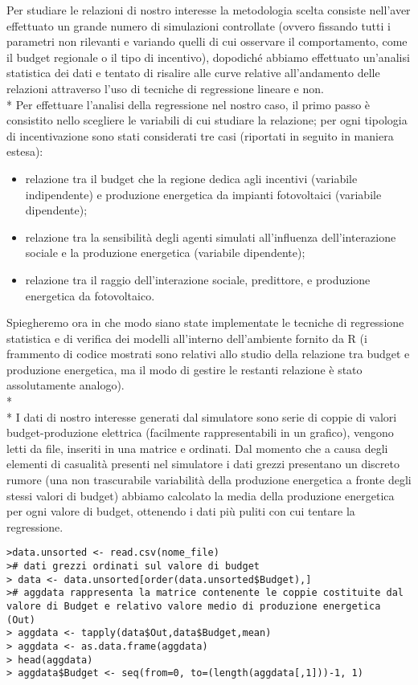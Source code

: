 \documentclass[12pt,a4paper,openright,twoside]{report}
\begin{document}
Per studiare le relazioni di nostro interesse la metodologia scelta consiste nell'aver effettuato un grande numero di simulazioni controllate (ovvero fissando tutti i parametri non rilevanti e variando quelli di cui osservare il comportamento, come il budget regionale o il tipo di incentivo), dopodiché abbiamo effettuato un'analisi statistica dei dati e tentato di risalire alle curve relative all'andamento delle relazioni attraverso l'uso di tecniche di regressione lineare e non.\\*
Per effettuare l'analisi della regressione nel nostro caso, il primo passo è consistito nello scegliere le variabili di cui studiare la relazione; per ogni tipologia di incentivazione sono stati considerati tre casi (riportati in seguito in maniera estesa):
\begin{itemize}
\item relazione tra il budget che la regione dedica agli incentivi (variabile indipendente) e produzione energetica da impianti fotovoltaici (variabile dipendente);
\item relazione tra la sensibilità degli agenti simulati all'influenza dell'interazione sociale e la produzione energetica (variabile dipendente);
\item relazione tra il raggio dell'interazione sociale, predittore, e produzione energetica da fotovoltaico.
\end{itemize}

Spiegheremo ora in che modo siano state implementate le tecniche di regressione statistica e di verifica dei modelli all'interno dell'ambiente fornito da R (i frammento di codice mostrati sono relativi allo studio della relazione tra budget e produzione energetica, ma il modo di gestire le restanti relazione è stato assolutamente analogo).\\*\\*
I dati di nostro interesse generati dal simulatore sono serie di coppie di valori budget-produzione elettrica (facilmente rappresentabili in un grafico), vengono letti da file, inseriti in una matrice e ordinati. Dal momento che a causa degli elementi di casualità presenti nel simulatore i dati grezzi presentano un discreto rumore (una non trascurabile variabilità della produzione energetica a fronte degli stessi valori di budget) abbiamo calcolato la media della produzione energetica per ogni valore di budget, ottenendo i dati più puliti con cui tentare la regressione.

\begin{lstlisting}
>data.unsorted <- read.csv(nome_file)
># dati grezzi ordinati sul valore di budget
> data <- data.unsorted[order(data.unsorted$Budget),]
># aggdata rappresenta la matrice contenente le coppie costituite dal valore di Budget e relativo valore medio di produzione energetica (Out)
> aggdata <- tapply(data$Out,data$Budget,mean)
> aggdata <- as.data.frame(aggdata)  
> head(aggdata)
> aggdata$Budget <- seq(from=0, to=(length(aggdata[,1]))-1, 1)
\end{lstlisting}
 
\end{document}
